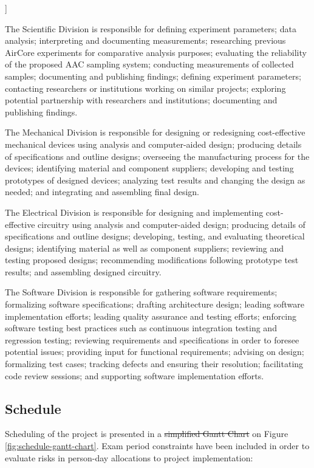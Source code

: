 ]\documentclass[a4paper,12pt,twoside]{article}
\providecommand{\DIFaddtex}[1]{{\protect\color{blue}\uwave{#1}}} %
\providecommand{\DIFdeltex}[1]{{\protect\color{red}\sout{#1}}}                      %
\providecommand{\DIFaddbegin}{} %
\providecommand{\DIFaddend}{} %
\providecommand{\DIFdelbegin}{} %
\providecommand{\DIFdelend}{} %
\providecommand{\DIFadd}[1]{\texorpdfstring{\DIFaddtex{#1}}{#1}} %
\providecommand{\DIFdel}[1]{\texorpdfstring{\DIFdeltex{#1}}{}} %
\newcommand{\DIFscaledelfig}{0.5}
\newlength{\DIFdelgraphicswidth} %
\newlength{\DIFdelgraphicsheight} %
\newcommand{\DIFaddincludegraphics}[2][]{{\color{blue}\fbox{\DIFOincludegraphics[#1]{#2}}}} %
\newcommand{\DIFdelincludegraphics}[2][]{%
\sbox{\DIFdelgraphicsbox}{\DIFOincludegraphics[#1]{#2}}%
\settoboxwidth{\DIFdelgraphicswidth}{\DIFdelgraphicsbox} %
\settoboxtotalheight{\DIFdelgraphicsheight}{\DIFdelgraphicsbox} %
\scalebox{\DIFscaledelfig}{%
\parbox[b]{\DIFdelgraphicswidth}{\usebox{\DIFdelgraphicsbox}\\[-\baselineskip] \rule{\DIFdelgraphicswidth}{0em}}\llap{\resizebox{\DIFdelgraphicswidth}{\DIFdelgraphicsheight}{%
\setlength{\unitlength}{\DIFdelgraphicswidth}%
\begin{picture}(1,1)%
\thicklines\linethickness{2pt} %
{\color[rgb]{1,0,0}\put(0,0){\framebox(1,1){}}}%
{\color[rgb]{1,0,0}\put(0,0){\line( 1,1){1}}}%
{\color[rgb]{1,0,0}\put(0,1){\line(1,-1){1}}}%
\end{picture}%
}\hspace*{3pt}}} %
} %
\DeclareRobustCommand{\DIFaddbegin}{\DIFOaddbegin \let\includegraphics\DIFaddincludegraphics} %
\DeclareRobustCommand{\DIFaddend}{\DIFOaddend \let\includegraphics\DIFOincludegraphics} %
\DeclareRobustCommand{\DIFdelbegin}{\DIFOdelbegin \let\includegraphics\DIFdelincludegraphics} %
\DeclareRobustCommand{\DIFdelend}{\DIFOaddend \let\includegraphics\DIFOincludegraphics} %
\begin{document}
The Scientific Division is responsible for defining experiment parameters; data analysis; interpreting and documenting measurements; researching previous AirCore experiments for comparative analysis purposes; evaluating the reliability of the proposed AAC sampling system; conducting measurements of collected samples; documenting and publishing findings; defining experiment parameters; contacting researchers or institutions working on similar projects; exploring potential partnership with researchers and institutions; documenting and publishing findings.

The Mechanical Division is responsible for designing or redesigning cost-effective mechanical devices using analysis and computer-aided design; producing details of specifications and outline designs; overseeing the manufacturing process for the devices; identifying material and component suppliers; developing and testing prototypes of designed devices; analyzing test results and changing the design as needed; and integrating and assembling final design.

The Electrical Division is responsible for designing and implementing cost-effective circuitry using analysis and computer-aided design; producing details of specifications and outline designs; developing, testing, and evaluating theoretical designs; identifying material as well as component suppliers; reviewing and testing proposed designs; recommending modifications following prototype test results; and assembling designed circuitry.

The Software Division is responsible for gathering software requirements; formalizing software specifications; drafting architecture design; leading software implementation efforts; leading quality assurance and testing efforts; enforcing software testing best practices such as continuous integration testing and regression testing; reviewing requirements and specifications in order to foresee potential issues; providing input for functional requirements; advising on design; formalizing test cases; tracking defects and ensuring their resolution; facilitating code review sessions; and supporting software implementation efforts.
\pagebreak
\subsection{Schedule}

Scheduling of the project is presented in a \DIFdelbegin \DIFdel{simplified Gantt Chart }\DIFdelend \DIFaddbegin \DIFadd{Gantt Chart overview }\DIFaddend on Figure \ref{fig:schedule-gantt-chart}. Exam period constraints have been included in order to evaluate risks in person-day allocations to project implementation:
\end{document}
